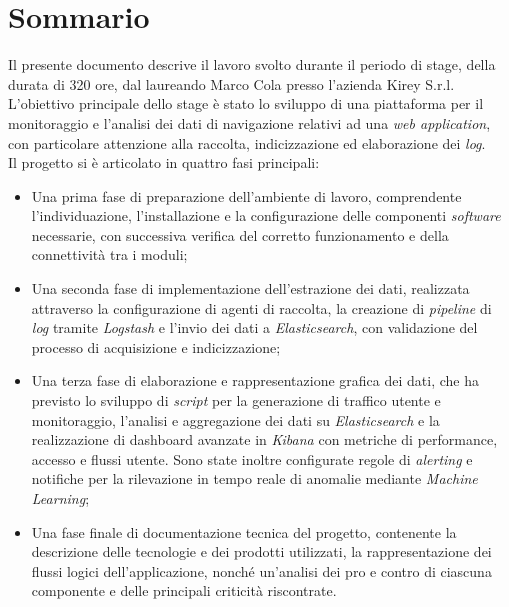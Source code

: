 \cleardoublepage
{}
{}
\begingroup
\let\clearpage\relax
\let\cleardoublepage\relax
\let\cleardoublepage\relax

\chapter*{Sommario}

Il presente documento descrive il lavoro svolto durante il periodo di stage, della durata di 320 ore, dal laureando Marco Cola presso l'azienda Kirey S.r.l. \\
L'obiettivo principale dello stage è stato lo sviluppo di una piattaforma per il monitoraggio e l'analisi dei dati di navigazione relativi ad una \emph{web application}, con particolare attenzione alla raccolta, indicizzazione ed elaborazione dei \emph{log}. \\
Il progetto si è articolato in quattro fasi principali:

\begin{itemize}
    \item Una prima fase di preparazione dell'ambiente di lavoro, comprendente l'individuazione, l'installazione e la configurazione delle componenti \emph{software} necessarie, con successiva verifica del corretto funzionamento e della connettività tra i moduli;
    \item Una seconda fase di implementazione dell'estrazione dei dati, realizzata attraverso la configurazione di agenti di raccolta, la creazione di \emph{pipeline} di \emph{log} tramite \emph{Logstash} e l'invio dei dati a \emph{Elasticsearch}, con validazione del processo di acquisizione e indicizzazione;
    \item Una terza fase di elaborazione e rappresentazione grafica dei dati, che ha previsto lo sviluppo di \emph{script} per la generazione di traffico utente e monitoraggio, l'analisi e aggregazione dei dati su \emph{Elasticsearch} e la realizzazione di dashboard avanzate in \emph{Kibana} con metriche di performance, accesso e flussi utente. Sono state inoltre configurate regole di \emph{alerting} e notifiche per la rilevazione in tempo reale di anomalie mediante \emph{Machine Learning};
    \item Una fase finale di documentazione tecnica del progetto, contenente la descrizione delle tecnologie e dei prodotti utilizzati, la rappresentazione dei flussi logici dell'applicazione, nonché un'analisi dei pro e contro di ciascuna componente e delle principali criticità riscontrate.
\end{itemize}

